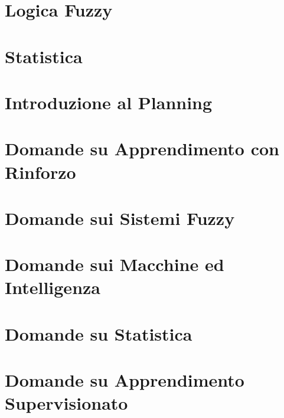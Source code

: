 \providecommand{\main}{.}








{\hypersetup{hidelinks}
  \tableofcontents  %
}

\chapter{Logica Fuzzy}


\chapter{Statistica}


\chapter{Introduzione al Planning}


\appendix
\chapter{Domande su Apprendimento con Rinforzo}


\chapter{Domande sui Sistemi Fuzzy}


\chapter{Domande sui Macchine ed Intelligenza}


\chapter{Domande su Statistica}


\chapter{Domande su Apprendimento Supervisionato}



